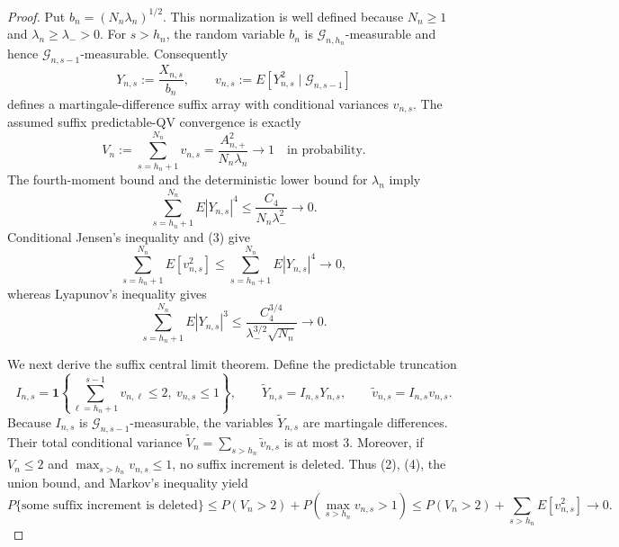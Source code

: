 \documentclass{article}
\begin{document}
\begin{proof}
Put \(b_n=(N_n\lambda_n)^{1/2}\).  This normalization is well defined because \(N_n\ge1\) and \(\lambda_n\ge\lambda_->0\).  For \(s>h_n\), the random variable \(b_n\) is \(\mathcal G_{n,h_n}\)-measurable and hence \(\mathcal G_{n,s-1}\)-measurable.  Consequently
\[
Y_{n,s}:=\frac{X_{n,s}}{b_n},\qquad
v_{n,s}:=E[Y_{n,s}^2\mid\mathcal G_{n,s-1}]
\tag{1}
\]
defines a martingale-difference suffix array with conditional variances \(v_{n,s}\).  The assumed suffix predictable-QV convergence is exactly
\[
V_n:=\sum_{s=h_n+1}^{N_n}v_{n,s}
=\frac{A_{n,+}^2}{N_n\lambda_n}\longrightarrow1
\quad\text{in probability}.
\tag{2}
\]
The fourth-moment bound and the deterministic lower bound for \(\lambda_n\) imply
\[
\sum_{s=h_n+1}^{N_n}E|Y_{n,s}|^4
\le \frac{C_4}{N_n\lambda_-^2}\longrightarrow0.
\tag{3}
\]
Conditional Jensen's inequality and (3) give
\[
\sum_{s=h_n+1}^{N_n}E[v_{n,s}^2]
\le \sum_{s=h_n+1}^{N_n}E|Y_{n,s}|^4\longrightarrow0,
\tag{4}
\]
whereas Lyapunov's inequality gives
\[
\sum_{s=h_n+1}^{N_n}E|Y_{n,s}|^3
\le \frac{C_4^{3/4}}{\lambda_-^{3/2}\sqrt{N_n}}\longrightarrow0.
\tag{5}
\]

We next derive the suffix central limit theorem.  Define the predictable truncation
\[
I_{n,s}=\mathbf1\!\left\{\sum_{\ell=h_n+1}^{s-1}v_{n,\ell}\le2,
\ v_{n,s}\le1\right\},\qquad
\widetilde Y_{n,s}=I_{n,s}Y_{n,s},\qquad
\widetilde v_{n,s}=I_{n,s}v_{n,s}.
\tag{6}
\]
Because \(I_{n,s}\) is \(\mathcal G_{n,s-1}\)-measurable, the variables \(\widetilde Y_{n,s}\) are martingale differences.  Their total conditional variance \(\widetilde V_n=\sum_{s>h_n}\widetilde v_{n,s}\) is at most \(3\).  Moreover, if \(V_n\le2\) and \(\max_{s>h_n}v_{n,s}\le1\), no suffix increment is deleted.  Thus (2), (4), the union bound, and Markov's inequality yield
\[
P\{\text{some suffix increment is deleted}\}
\le P(V_n>2)+P\!\left(\max_{s>h_n}v_{n,s}>1\right)
\le P(V_n>2)+\sum_{s>h_n}E[v_{n,s}^2]
\longrightarrow0.
\tag{7}
\]


\end{proof}
\end{document}
